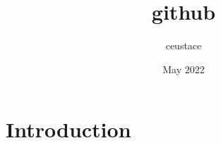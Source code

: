 \documentclass{article}
\title{github}
\author{ceustace }
\date{May 2022}
\begin{document}
\maketitle

\section{Introduction}
\end{document}
